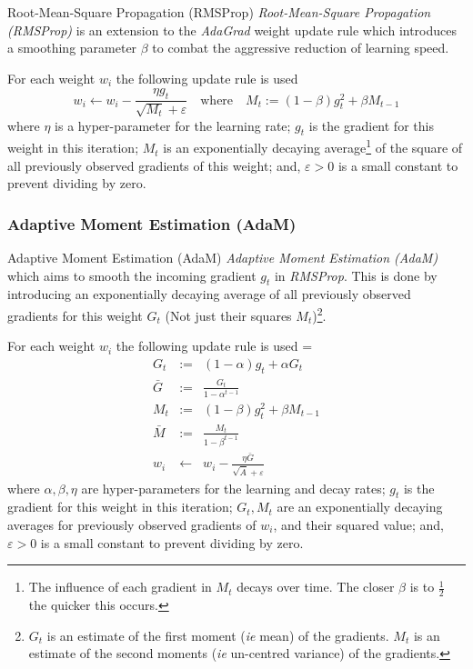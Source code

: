 \documentclass[11pt,a4paper]{article}
\begin{document}
  \begin{definition}{Root-Mean-Square Propagation (RMSProp)}
    \textit{Root-Mean-Square Propagation (RMSProp)} is an extension to the \textit{AdaGrad} weight update rule which introduces a smoothing parameter $\beta$ to combat the aggressive reduction of learning speed.
    \par For each weight $w_i$ the following update rule is used
    \[
      w_i\leftarrow w_i-\frac{\eta g_t}{\sqrt{M_t}+\varepsilon}\quad\text{where}\quad M_t:=(1-\beta) g_t^2+\beta M_{t-1}
    \]
    where $\eta$ is a hyper-parameter for the learning rate; $g_t$ is the gradient for this weight in this iteration; $M_t$ is an  exponentially decaying average\footnote{The influence of each gradient in $M_t$ decays over time. The closer $\beta$ is to $\frac12$ the quicker this occurs.} of the square of all previously observed gradients of this weight; and, $\varepsilon>0$ is a small constant to prevent dividing by zero.
  \end{definition}

\subsubsection{Adaptive Moment Estimation (AdaM)}

  \begin{definition}{Adaptive Moment Estimation (AdaM)}
    \textit{Adaptive Moment Estimation (AdaM)} which aims to smooth the incoming gradient $g_t$ in \textit{RMSProp}. This is done by introducing an exponentially decaying average of all previously observed gradients for this weight $G_t$ (Not just their squares $M_t$)\footnote{$G_t$ is an estimate of the first moment (\textit{ie} mean) of the gradients. $M_t$ is an estimate of the second moments (\textit{ie} un-centred variance) of the gradients.}.
    \par For each weight $w_i$ the following update rule is used
    \everymath={\displaystyle}
    \[\begin{array}{rrl}
      G_t&:=&(1-\alpha)g_t+\alpha G_t\\
      \bar{G}&:=&\frac{G_t}{1-\alpha^{t-1}}\\
      M_t&:=&(1-\beta)g_t^2+\beta M_{t-1}\\
      \bar{M}&:=&\frac{M_t}{1-\beta^{t-1}}\\
      w_i&\leftarrow&w_i-\frac{\eta\bar{G}}{\sqrt{\bar{A}}+\varepsilon}
    \end{array}\]
    where $\alpha,\beta,\eta$ are hyper-parameters for the learning and decay rates; $g_t$ is the gradient for this weight in this iteration; $G_t,M_t$ are an exponentially decaying averages for previously observed gradients of $w_i$, and their squared value; and, $\varepsilon>0$ is a small constant to prevent dividing by zero.
  \end{definition}
\end{document}

